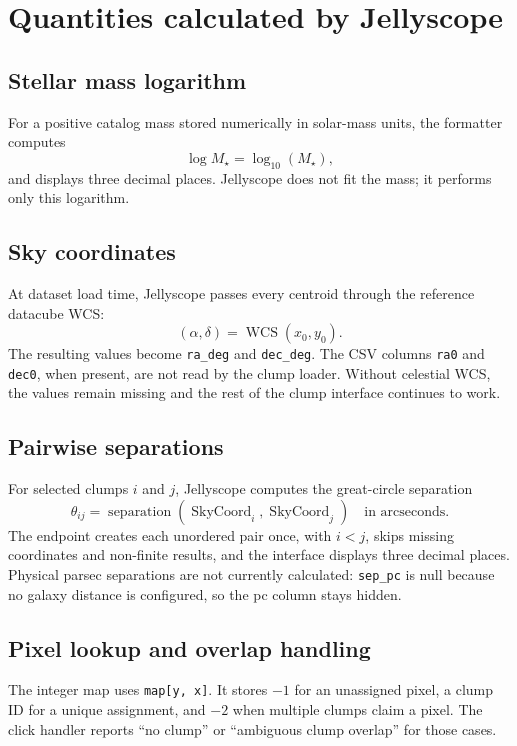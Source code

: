 \documentclass[11pt]{article}
\newcommand{\code}[1]{\texttt{#1}}
\begin{document}
\section{Quantities calculated by Jellyscope}
\subsection{Stellar mass logarithm}
For a positive catalog mass stored numerically in solar-mass units, the formatter computes
\begin{equation}
 \log M_\star = \log_{10}(M_\star),
\end{equation}
and displays three decimal places. Jellyscope does not fit the mass; it performs only this logarithm.
\subsection{Sky coordinates}
At dataset load time, Jellyscope passes every centroid through the reference datacube WCS:
\begin{equation}
 (\alpha,\delta) = \operatorname{WCS}(x_0,y_0).
\end{equation}
The resulting values become \code{ra\_deg} and \code{dec\_deg}. The CSV columns \code{ra0} and \code{dec0}, when present, are not read by the clump loader. Without celestial WCS, the values remain missing and the rest of the clump interface continues to work.
\subsection{Pairwise separations}
For selected clumps $i$ and $j$, Jellyscope computes the great-circle separation
\begin{equation}
 \theta_{ij} = \operatorname{separation}(\operatorname{SkyCoord}_i, \operatorname{SkyCoord}_j)\quad\text{in arcseconds}.
\end{equation}
The endpoint creates each unordered pair once, with $i<j$, skips missing coordinates and non-finite results, and the interface displays three decimal places. Physical parsec separations are not currently calculated: \code{sep\_pc} is null because no galaxy distance is configured, so the pc column stays hidden.
\subsection{Pixel lookup and overlap handling}
The integer map uses \code{map[y, x]}. It stores $-1$ for an unassigned pixel, a clump ID for a unique assignment, and $-2$ when multiple clumps claim a pixel. The click handler reports ``no clump'' or ``ambiguous clump overlap'' for those cases.
\end{document}
